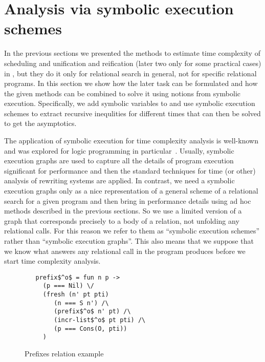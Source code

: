\section{Analysis via symbolic execution schemes}

In the previous sections we presented the methods to estimate time complexity of scheduling and unification and reification (later two only for some practical cases) in \mK, but they do it only for relational search in general, not for specific relational programs. In this section we show how the later task can be formulated and how the given methods can be combined to solve it using notions from symbolic execution. Specifically, we add symbolic variables to \mK and use symbolic execution schemes to extract recursive inequlities for different times that can then be solved to get the asymptotics.

The application of symbolic execution for time complexity analysis is well-known and was explored for logic programming in particular~\cite{SymbolicExecutionForAnalysis}. Usually, symbolic execution graphs are used to capture all the details of program execution significant for performance and then the standard techniques for time (or other) analysis of rewriting systems are applied. In contrast, we need a symbolic execution graphs only as a nice representation of a general scheme of a relational search for a given program and then bring in performance details using ad hoc methods described in the previous sections. So we use a limited version of a graph that corresponds precisely to a body of a relation, not unfolding any relational calls. For this reason we refer to them as ``symbolic execution schemes'' rather than ``symbolic execution graphs''. This also means that we suppose that we know what answers any relational call in the program produces before we start time complexity analysis.

\begin{figure}[t]
\begin{lstlisting}
   prefix$^o$ = fun n p ->
     (p === Nil) \/
     (fresh (n' pt pti)
        (n === S n') /\
        (prefix$^o$ n' pt) /\
        (incr-list$^o$ pt pti) /\
        (p === Cons(O, pti))
     )
\end{lstlisting}

\caption{Prefixes relation example}
\label{fig:prefixo_definition}
\end{figure}

